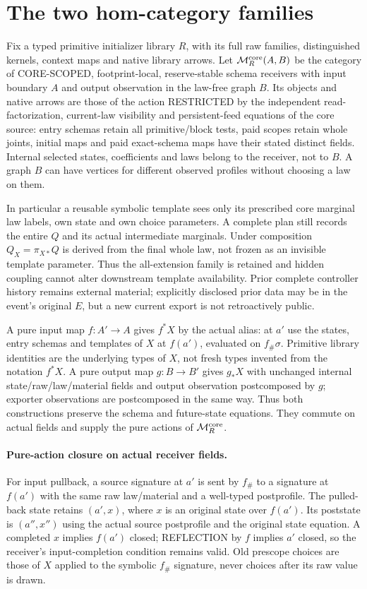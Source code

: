 \documentclass[11pt]{article}
\begin{document}
\section{The two hom-category families}
Fix a typed primitive initializer library $R$, with its full raw families, distinguished kernels, context maps and native library arrows. Let $\mathcal M_R^{\rm core}(A,B)$ be the category of CORE-SCOPED, footprint-local, reserve-stable schema receivers with input boundary $A$ and output observation in the law-free graph $B$. Its objects and native arrows are those of the action RESTRICTED by the independent read-factorization, current-law visibility and persistent-feed equations of the core source: entry schemas retain all primitive/block tests, paid scopes retain whole joints, initial maps and paid exact-schema maps have their stated distinct fields. Internal selected states, coefficients and laws belong to the receiver, not to $B$. A graph $B$ can have vertices for different observed profiles without choosing a law on them.

In particular a reusable symbolic template sees only its prescribed core marginal law labels, own state and own choice parameters. A complete plan still records the entire $Q$ and its actual intermediate marginals. Under composition $Q_X=\pi_{X*}Q$ is derived from the final whole law, not frozen as an invisible template parameter. Thus the all-extension family is retained and hidden coupling cannot alter downstream template availability. Prior complete controller history remains external material; explicitly disclosed prior data may be in the event's original $E$, but a new current export is not retroactively public.

A pure input map $f:A'\to A$ gives $f^*X$ by the actual alias: at $a'$ use the states, entry schemas and templates of $X$ at $f(a')$, evaluated on $f_\#\sigma$. Primitive library identities are the underlying types of $X$, not fresh types invented from the notation $f^*X$. A pure output map $g:B\to B'$ gives $g_*X$ with unchanged internal state/raw/law/material fields and output observation postcomposed by $g$; exporter observations are postcomposed in the same way. Thus both constructions preserve the schema and future-state equations. They commute on actual fields and supply the pure actions of $\mathcal M_R^{\rm core}$.

\paragraph{Pure-action closure on actual receiver fields.}
For input pullback, a source signature at $a'$ is sent by $f_\#$ to a signature at $f(a')$ with the same raw law/material and a well-typed postprofile. The pulled-back state retains $(a',x)$, where $x$ is an original state over $f(a')$. Its poststate is $(a'',x'')$ using the actual source postprofile and the original state equation. A completed $x$ implies $f(a')$ closed; REFLECTION by $f$ implies $a'$ closed, so the receiver's input-completion condition remains valid. Old prescope choices are those of $X$ applied to the symbolic $f_\#$ signature, never choices after its raw value is drawn.
\end{document}
